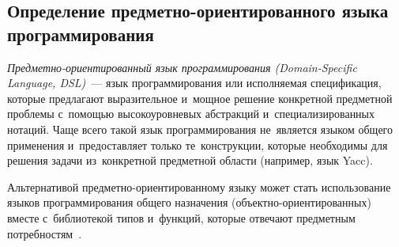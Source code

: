 \subsection{Определение предметно-ориентированного языка программирования} \label{sub121}

\textit{Предметно-ориентированный язык программирования (Domain-Specific Language, DSL)}~--- язык программирования или исполняемая спецификация, которые предлагают выразительное и~мощное решение конкретной предметной проблемы с~помощью высокоуровневых абстракций и~специализированных нотаций. Чаще всего такой язык программирования не~является языком общего применения и~предоставляет только те~конструкции, которые необходимы для решения задачи из~конкретной предметной области (например, язык Yacc).

Альтернативой предметно-ориентированному языку может стать использование языков программирования общего назначения (объектно-ориентированных) вместе с~библиотекой типов и~функций, которые отвечают предметным потребностям~\cite{Deursen1998}.